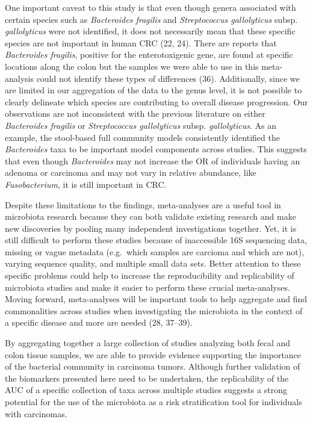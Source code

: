 \documentclass[12pt,]{article}
\begin{document}
One important caveat to this study is that even though genera associated
with certain species such as \emph{Bacteroides fragilis} and
\emph{Streptococcus gallolyticus} subsp. \emph{gallolyticus} were not
identified, it does not necessarily mean that these specific species are
not important in human CRC (22, 24). There are reports that
\emph{Bacteroides fragilis}, positive for the enterotoxigenic gene, are
found at specific locations along the colon but the samples we were able
to use in this meta-analysis could not identify these types of
differences (36). Additionally, since we are limited in our aggregation
of the data to the genus level, it is not possible to clearly delineate
which species are contributing to overall disease progression. Our
observations are not inconsistent with the previous literature on either
\emph{Bacteroides fragilis} or \emph{Streptococcus gallolyticus} subsp.
\emph{gallolyticus}. As an example, the stool-based full community
models consistently identified the \emph{Bacteroides} taxa to be
important model components across studies. This suggests that even
though \emph{Bacteroides} may not increase the OR of individuals having
an adenoma or carcinoma and may not vary in relative abundance, like
\emph{Fusobacterium}, it is still important in CRC.

Despite these limitations to the findings, meta-analyses are a useful
tool in microbiota research because they can both validate existing
research and make new discoveries by pooling many independent
investigations together. Yet, it is still difficult to perform these
studies because of inaccessible 16S sequencing data, missing or vague
metadata (e.g.~which samples are carcioma and which are not), varying
sequence quality, and multiple small data sets. Better attention to
these specific problems could help to increase the reproducibility and
replicability of microbiota studies and make it easier to perform these
crucial meta-analyses. Moving forward, meta-analyses will be important
tools to help aggregate and find commonalities across studies when
investigating the microbiota in the context of a specific disease and
more are needed (28, 37--39).

By aggregating together a large collection of studies analyzing both
fecal and colon tissue samples, we are able to provide evidence
supporting the importance of the bacterial community in carcinoma
tumors. Although further validation of the biomarkers presented here
need to be undertaken, the replicability of the AUC of a specific
collection of taxa across multiple studies suggests a strong potential
for the use of the microbiota as a risk stratification tool for
individuals with carcinomas.
\end{document}
